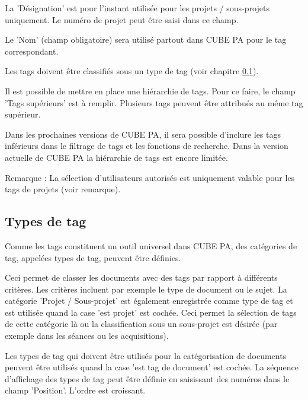 La 'Désignation' est pour l'instant utilisée pour les projets / sous-projets uniquement. Le numéro de projet peut être saisi dans ce champ.

\vspace{\baselineskip}

Le 'Nom' (champ obligatoire) sera utilisé partout dans CUBE PA pour le tag correspondant.

\vspace{\baselineskip}

Les tags doivent être classifiés sous un type de tag (voir chapitre \ref{bkm:Ref444100222}).

\vspace{\baselineskip}

Il est possible de mettre en place une hiérarchie de tags. Pour ce faire, le champ 'Tags supérieurs' est à remplir. Plusieurs tags peuvent être attribués au même tag supérieur.

\vspace{\baselineskip}

Dans les prochaines versions de CUBE PA, il sera possible d'inclure les tags inférieurs dans le filtrage de tags et les fonctions de recherche. Dans la version actuelle de CUBE PA la hiérarchie de tags est encore limitée.

\vspace{\baselineskip}

Remarque : La sélection d'utilisateurs autorisés est uniquement valable pour les tags de projets (voir remarque).

\subsection{Types de tag}
\label{bkm:Ref444100222}
Comme les tags constituent un outil universel dans CUBE PA, des catégories de tag, appelées types de tag, peuvent être définies. \newline

Ceci permet de classer les documents avec des tags par rapport à différents critères. Les critères incluent par exemple le type de document ou le sujet. La catégorie 'Projet / Sous-projet' est également enregistrée comme type de tag et est utilisée quand la case 'est projet' est cochée. Ceci permet la sélection de tags de cette catégorie là ou la classification sous un sous-projet est désirée (par exemple dans les séances ou les acquisitions). \newline

Les types de tag qui doivent être utilisés pour la catégorisation de documents peuvent être utilisés quand la case 'est tag de document' est cochée. La séquence d'affichage des types de tag peut être définie en saisissant des numéros dans le champ 'Position'. L'ordre est croissant.

